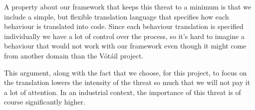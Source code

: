 A property about our framework that keeps this threat to a minimum is that we include a simple, but flexible translation language that specifies how each behaviour is translated into code. Since each behaviour translation is specified individually we have a lot of control over the process, so it’s hard to imagine a behaviour that would not work with our framework even though it might come from another domain than the Vótáil project.
 
This argument, along with the fact that we choose, for this project, to focus on the translation lowers the intensity of the threat so much that we will not pay it a lot of attention. In an industrial context, the importance of this threat is of course significantly higher.



